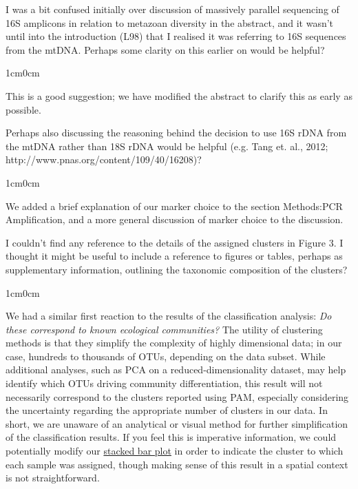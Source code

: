 \documentclass{article}
\newenvironment{response}
	{
	\begin{adjustwidth}{1cm}{0cm}
	\color{peerjBlue}
	}
	{
	\end{adjustwidth}
	}
\begin{document}
I was a bit confused initially over discussion of massively parallel sequencing of 16S amplicons in relation to metazoan diversity in the abstract, and it wasn’t until into the introduction (L98) that I realised it was referring to 16S sequences from the mtDNA. Perhaps some clarity on this earlier on would be helpful?
\begin{response}
  This is a good suggestion; we have modified the abstract to clarify this as early as possible.\\
\end{response}

Perhaps also discussing the reasoning behind the decision to use 16S rDNA from the mtDNA rather than 18S rDNA would be helpful (e.g. Tang et. al., 2012; http://www.pnas.org/content/109/40/16208)?
\begin{response}
  We added a brief explanation of our marker choice to the section Methods:PCR Amplification, and a more general discussion of marker choice to the discussion.\\
\end{response}

I couldn’t find any reference to the details of the assigned clusters in Figure 3. I thought it might be useful to include a reference to figures or tables, perhaps as supplementary information, outlining the taxonomic composition of the clusters?
\begin{response}
	We had a similar first reaction to the results of the classification analysis: \textit{Do these correspond to known ecological communities?}
  The utility of clustering methods is that they simplify the complexity of highly dimensional data; in our case, hundreds to thousands of OTUs, depending on the data subset.
	While additional analyses, such as PCA on a reduced-dimensionality dataset, may help identify which OTUs driving community differentiation, this result will not necessarily correspond to the clusters reported using PAM, especially considering the uncertainty regarding the appropriate number of clusters in our data.
	In short, we are unaware of an analytical or visual method for further simplification of the classification results.
	If you feel this is imperative information, we could potentially modify our \href{https://github.com/jimmyodonnell/Carkeek_eDNA_grid/blob/master/Figures/stacked_bar_community.pdf}{stacked bar plot} in order to indicate the cluster to which each sample was assigned, though making sense of this result in a spatial context is not straightforward.
	\\
\end{response}
\end{document}

